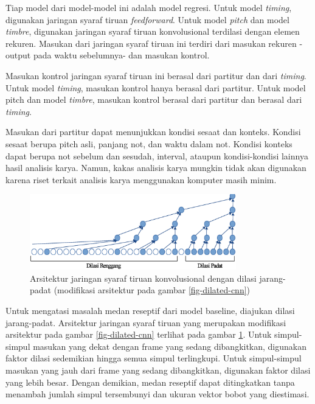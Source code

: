 Tiap model dari model-model ini adalah model regresi. Untuk model \textit{timing}, digunakan jaringan syaraf tiruan \textit{feedforward}. Untuk model \textit{pitch} dan model \textit{timbre}, digunakan jaringan syaraf tiruan konvolusional terdilasi dengan elemen rekuren. Masukan dari jaringan syaraf tiruan ini terdiri dari masukan rekuren -output pada waktu sebelumnya- dan masukan kontrol.

Masukan kontrol jaringan syaraf tiruan ini berasal dari partitur dan dari \textit{timing}. Untuk model \textit{timing}, masukan kontrol hanya berasal dari partitur. Untuk model pitch dan model \textit{timbre}, masukan kontrol berasal dari partitur dan berasal dari \textit{timing}.

Masukan dari partitur dapat menunjukkan kondisi sesaat dan konteks. Kondisi sesaat berupa pitch asli, panjang not, dan waktu dalam not. Kondisi konteks dapat berupa not sebelum dan sesudah, interval, ataupun kondisi-kondisi lainnya hasil analisis karya. Namun, kakas analisis karya mungkin tidak akan digunakan karena riset terkait analisis karya menggunakan komputer masih minim.

\begin{figure}[h]
    \centering
    \includegraphics[width=0.8\textwidth]{resources/sparse-dense-dilated-cnn.eps}
    \caption{Arsitektur jaringan syaraf tiruan konvolusional dengan dilasi jarang-padat (modifikasi arsitektur pada gambar \ref{fig-dilated-cnn})}\label{fig-sparsedilated-cnn}
\end{figure}

Untuk mengatasi masalah medan reseptif dari model baseline, diajukan dilasi jarang-padat. Arsitektur jaringan syaraf tiruan yang merupakan modifikasi arsitektur pada gambar \ref{fig-dilated-cnn} terlihat pada gambar \ref{fig-sparsedilated-cnn}. Untuk simpul-simpul masukan yang dekat dengan frame yang sedang dibangkitkan, digunakan faktor dilasi sedemikian hingga semua simpul terlingkupi. Untuk simpul-simpul masukan yang jauh dari frame yang sedang dibangkitkan, digunakan faktor dilasi yang lebih besar. Dengan demikian, medan reseptif dapat ditingkatkan tanpa menambah jumlah simpul tersembunyi dan ukuran vektor bobot yang diestimasi.

